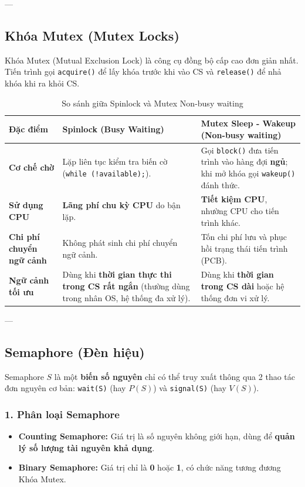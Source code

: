 \documentclass[11pt,a4paper]{article}
\begin{document}
---

\subsection{Khóa Mutex (Mutex Locks)}
Khóa Mutex (Mutual Exclusion Lock) là công cụ đồng bộ cấp cao đơn giản nhất. Tiến trình gọi \texttt{acquire()} để lấy khóa trước khi vào CS và \texttt{release()} để nhả khóa khi ra khỏi CS.

\begin{table}[h!]
\centering
\small
\begin{tabularx}{\textwidth}{p{3cm} X X}
\toprule
\textbf{Đặc điểm} & \textbf{Spinlock (Busy Waiting)} & \textbf{Mutex Sleep - Wakeup (Non-busy waiting)} \\
\midrule
\textbf{Cơ chế chờ} & Lặp liên tục kiểm tra biến cờ (\texttt{while (!available);}). & Gọi \texttt{block()} đưa tiến trình vào hàng đợi \textbf{ngủ}; khi mở khóa gọi \texttt{wakeup()} đánh thức. \\
\textbf{Sử dụng CPU} & \textbf{Lãng phí chu kỳ CPU} do bận lặp. & \textbf{Tiết kiệm CPU}, nhường CPU cho tiến trình khác. \\
\textbf{Chi phí chuyển ngữ cảnh} & Không phát sinh chi phí chuyển ngữ cảnh. & Tốn chi phí lưu và phục hồi trạng thái tiến trình (PCB). \\
\textbf{Ngữ cảnh tối ưu} & Dùng khi \textbf{thời gian thực thi trong CS rất ngắn} (thường dùng trong nhân OS, hệ thống đa xử lý). & Dùng khi \textbf{thời gian trong CS dài} hoặc hệ thống đơn vi xử lý. \\
\bottomrule
\end{tabularx}
\caption{So sánh giữa Spinlock và Mutex Non-busy waiting}
\end{table}

---

\subsection{Semaphore (Đèn hiệu)}

\begin{summarybox}
Semaphore $S$ là một \textbf{biến số nguyên} chỉ có thể truy xuất thông qua 2 thao tác đơn nguyên cơ bản: \texttt{wait(S)} (hay $P(S)$) và \texttt{signal(S)} (hay $V(S)$).
\end{summarybox}

\subsubsection{1. Phân loại Semaphore}
\begin{itemize}[noitemsep]
    \item \textbf{Counting Semaphore:} Giá trị là số nguyên không giới hạn, dùng để \textbf{quản lý số lượng tài nguyên khả dụng}.
    \item \textbf{Binary Semaphore:} Giá trị chỉ là \textbf{0} hoặc \textbf{1}, có chức năng tương đương Khóa Mutex.
\end{itemize}
\end{document}

